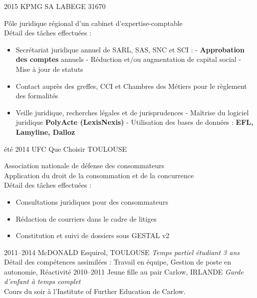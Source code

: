 \documentclass[]{friggeri-cv} %
\begin{document}
\begin{entrylist}
\entry
{2015}
{KPMG SA }
{LABEGE 31670}
{Pôle juridique régional d’un cabinet d’expertise-comptable\\
Détail des tâches effectuées :
\begin{itemize}
\item Secrétariat juridique annuel de SARL, SAS, SNC et SCI :
\subitem - \textbf{Approbation des comptes} annuels
\subitem - Réduction et/ou augmentation de capital social
\subitem - Mise à jour de statuts
\item Contact auprès des greffes, CCI et Chambres des Métiers pour le règlement des formalités
\item Veille juridique, recherches légales et de jurisprudences
\subitem - Maîtrise du logiciel juridique \textbf{PolyActe (LexisNexis)}
\subitem - Utilisation des bases de données : \textbf{EFL, Lamyline, Dalloz}
\end{itemize}}
\entry
{été 2014}
{UFC Que Choisir }
{TOULOUSE}
{Association nationale de défense des consommateurs \\
Application du droit de la consommation et de la concurrence\\
Détail des tâches effectuées :
\begin{itemize}
\item Consultations juridiques pour des consommateurs
\item Rédaction de courriers dans le cadre de litiges
\item Constitution et suivi de dossiers sous GESTAL v2
\end{itemize}}

\entry
{2011--2014}
{McDONALD}
{Esquirol, TOULOUSE}
{\emph{Temps partiel étudiant 3 ans} \\
Détail des compétences assimilées :
Travail en équipe, Gestion de poste en autonomie, Réactivité}
\entry
{2010--2011}
{Jeune fille au pair}
{Carlow, IRLANDE}
{\emph{Garde d'enfant à temps complet} \\
Cours du soir à l'Institute of Further Education de Carlow.}
\end{entrylist}



\end{document}
